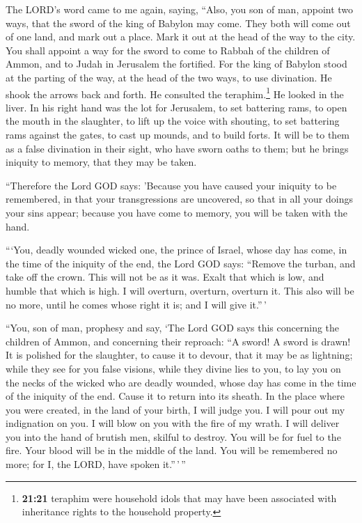  The LORD's word came to me again, saying,
 ``Also, you son of man, appoint two ways, that the sword
of the king of Babylon may come. They both will come out of one land,
and mark out a place. Mark it out at the head of the way to the city.
 You shall appoint a way for the sword to come to Rabbah
of the children of Ammon, and to Judah in Jerusalem the fortified.
 For the king of Babylon stood at the parting of the way,
at the head of the two ways, to use divination. He shook the arrows back
and forth. He consulted the teraphim.\footnote{\textbf{21:21} teraphim
  were household idols that may have been associated with inheritance
  rights to the household property.} He looked in the liver.
 In his right hand was the lot for Jerusalem, to set
battering rams, to open the mouth in the slaughter, to lift up the voice
with shouting, to set battering rams against the gates, to cast up
mounds, and to build forts.  It will be to them as a
false divination in their sight, who have sworn oaths to them; but he
brings iniquity to memory, that they may be taken.

 ``Therefore the Lord GOD says: 'Because you have caused
your iniquity to be remembered, in that your transgressions are
uncovered, so that in all your doings your sins appear; because you have
come to memory, you will be taken with the hand.

 ```You, deadly wounded wicked one, the prince of Israel,
whose day has come, in the time of the iniquity of the end,
 the Lord GOD says: ``Remove the turban, and take off the
crown. This will not be as it was. Exalt that which is low, and humble
that which is high.  I will overturn, overturn, overturn
it. This also will be no more, until he comes whose right it is; and I
will give it.''\,'

 ``You, son of man, prophesy and say, `The Lord GOD says
this concerning the children of Ammon, and concerning their reproach:
``A sword! A sword is drawn! It is polished for the slaughter, to cause
it to devour, that it may be as lightning;  while they
see for you false visions, while they divine lies to you, to lay you on
the necks of the wicked who are deadly wounded, whose day has come in
the time of the iniquity of the end.  Cause it to return
into its sheath. In the place where you were created, in the land of
your birth, I will judge you.  I will pour out my
indignation on you. I will blow on you with the fire of my wrath. I will
deliver you into the hand of brutish men, skilful to destroy.
 You will be for fuel to the fire. Your blood will be in
the middle of the land. You will be remembered no more; for I, the LORD,
have spoken it.''\,'\,''

